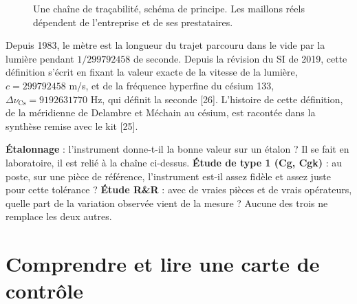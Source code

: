 \documentclass[11pt,a4paper]{article}
\begin{document}
\begin{figure}[h]
\centering
{}
\caption{Une chaîne de traçabilité, schéma de principe. Les maillons réels dépendent de l'entreprise et de ses prestataires.}
\end{figure}

Depuis 1983, le mètre est la longueur du trajet parcouru dans le vide par la lumière pendant $1/\num{299792458}$ de seconde. Depuis la révision du SI de 2019, cette définition s'écrit en fixant la valeur exacte de la vitesse de la lumière, $c = \num{299792458}$ m/s, et de la fréquence hyperfine du césium 133, $\Delta\nu_{\mathrm{Cs}} = \num{9192631770}$ Hz, qui définit la seconde [26]. L'histoire de cette définition, de la méridienne de Delambre et Méchain au césium, est racontée dans la synthèse remise avec le kit [25].

\begin{retenir}
\textbf{Étalonnage} : l'instrument donne-t-il la bonne valeur sur un étalon ? Il se fait en laboratoire, il est relié à la chaîne ci-dessus. \textbf{Étude de type 1 (Cg, Cgk)} : au poste, sur une pièce de référence, l'instrument est-il assez fidèle et assez juste pour cette tolérance ? \textbf{Étude R\&R} : avec de vraies pièces et de vrais opérateurs, quelle part de la variation observée vient de la mesure ? Aucune des trois ne remplace les deux autres.
\end{retenir}

\clearpage
\section{Comprendre et lire une carte de contrôle}\label{sec:B}
\end{document}
